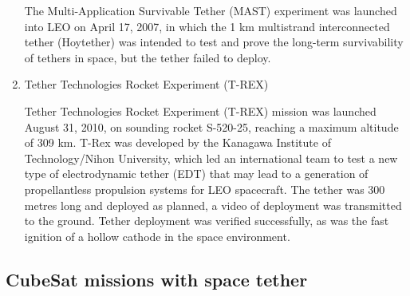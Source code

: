 \begin{enumerate}
The Multi-Application Survivable Tether (MAST) experiment was launched into LEO on April 17, 2007, in which the 1 km multistrand interconnected tether (Hoytether) was intended to test and prove the long-term survivability of tethers in space, but the tether failed to deploy. 
\item{Tether Technologies Rocket Experiment (T-REX)}

Tether Technologies Rocket Experiment (T-REX) mission was launched August 31, 2010, on sounding rocket S-520-25, reaching a maximum altitude of 309 km. T-Rex was developed by the Kanagawa Institute of Technology/Nihon University, which led an international team to test a new type of electrodynamic tether (EDT) that may lead to a generation of propellantless propulsion systems for LEO spacecraft. The tether was 300 metres long and deployed as planned, a video of deployment was transmitted to the ground. Tether deployment was verified successfully, as was the fast ignition of a hollow cathode in the space environment.
\end{enumerate} 

\subsection{CubeSat missions with space tether}


